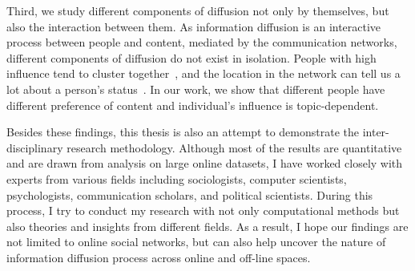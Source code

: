 \documentclass[phd,tocprelim]{cornell}
\begin{document}

Third, we study different components of diffusion not only by themselves, but also the interaction between them. As information diffusion is an interactive process between people and content, mediated by the communication networks, different components of diffusion do not exist in isolation. People with high influence tend to cluster together~\cite{Aral-2012}, and the location in the network can tell us a lot about a person's status~\cite{Kempe-2003,Backstrom:2006}. In our work, we show that different people have different preference of content and individual's influence is topic-dependent.


Besides these findings, this thesis is also an attempt to demonstrate the inter-disciplinary research methodology.
Although most of the results are quantitative and are drawn from analysis on large online datasets, I have worked closely with experts from various fields including sociologists, computer scientists, psychologists, communication scholars, and political scientists. During this process, I try to conduct my research with not only computational methods but also theories and insights from different fields. As a result, I hope our findings are not limited to online social networks, but can also help uncover the nature of information diffusion process across online and off-line spaces.

\end{document}
